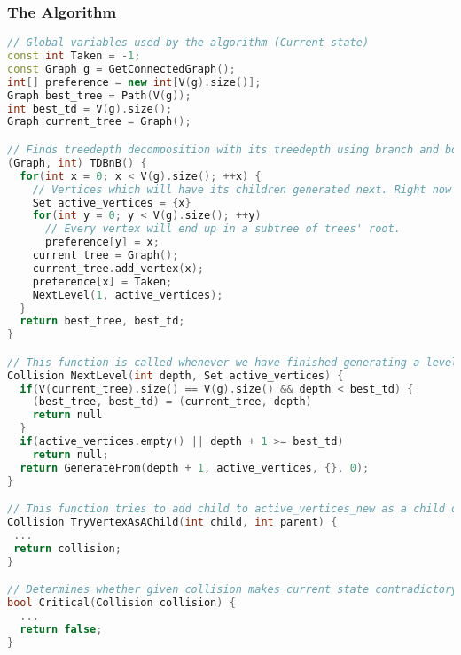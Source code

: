 \subsubsection{The Algorithm}
\begin{lstlisting}[language=C++]
// Global variables used by the algorithm (Current state)
const int Taken = -1;
const Graph g = GetConnectedGraph();
int[] preference = new int[V(g).size()];
Graph best_tree = Path(V(g));
int best_td = V(g).size();
Graph current_tree = Graph();

// Finds treedepth decomposition with its treedepth using branch and bound technique
(Graph, int) TDBnB() {
  for(int x = 0; x < V(g).size(); ++x) {
    // Vertices which will have its children generated next. Right now it's just root.
    Set active_vertices = {x}
    for(int y = 0; y < V(g).size(); ++y)
      // Every vertex will end up in a subtree of trees' root.
      preference[y] = x;
    current_tree = Graph();
    current_tree.add_vertex(x);
    preference[x] = Taken;
    NextLevel(1, active_vertices);
  }
  return best_tree, best_td;
}

// This function is called whenever we have finished generating a level in current_tree. active_vertices is a set of vertices which will have its children chosen next. Depth tells us how deep finished level is. It checks whether we have a chance improving previous results and starts generation of next level.
Collision NextLevel(int depth, Set active_vertices) {
  if(V(current_tree).size() == V(g).size() && depth < best_td) {
    (best_tree, best_td) = (current_tree, depth)
    return null
  }
  if(active_vertices.empty() || depth + 1 >= best_td)
    return null;
  return GenerateFrom(depth + 1, active_vertices, {}, 0);
}

// This function tries to add child to active_vertices_new as a child of parent and update both current_tree and history. When it contradics with treedepth decomposition definition, it returns an error and makes no changes to current state.
Collision TryVertexAsAChild(int child, int parent) {
 ...
 return collision;
}

// Determines whether given collision makes current state contradictory with treedepth decomposition definition
bool Critical(Collision collision) {
  ...
  return false;
}


\end{lstlisting}
